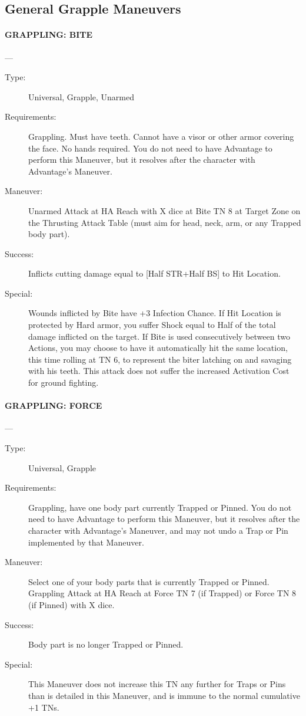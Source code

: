 \documentclass[oneside,11pt,english]{book}
\begin{document}
\subsection{General Grapple Maneuvers}
\paragraph{\large\label{man:GRAPPLING: BITE} GRAPPLING: BITE}---\quad{\large[X+1]}
\vspace{-10pt}\begin{description} 
\item [Type:] Universal, Grapple, Unarmed 
\item [Requirements:] Grappling. Must have teeth. Cannot have a visor or other armor covering the face. No 
hands required. You do not need to have Advantage to perform this Maneuver, but it resolves after the 
character with Advantage's Maneuver. 
\item [Maneuver:] Unarmed Attack at HA Reach with X dice at Bite TN 8 at Target Zone on the Thrusting 
Attack Table (must aim for head, neck, arm, or any Trapped body part). 
\item [Success:] Inflicts cutting damage equal to [Half STR+Half BS] to Hit Location. 
\item [Special:] Wounds inflicted by Bite have +3 Infection Chance. If Hit Location is protected by Hard armor, 
you suffer Shock equal to Half of the total damage inflicted on the target. 
If Bite is used consecutively between two Actions, you may choose to have it automatically hit the same 
location, this time rolling at TN 6, to represent the biter latching on and savaging with his teeth. 
This attack does not suffer the increased Activation Cost for ground fighting. 
\end{description}

\paragraph{\large\label{man:GRAPPLING: FORCE} GRAPPLING: FORCE}---\quad{\large[X+1]}
\vspace{-10pt}\begin{description} 
\item [Type:] Universal, Grapple 
\item [Requirements:] Grappling, have one body part currently Trapped or Pinned. You do not need to have 
Advantage to perform this Maneuver, but it resolves after the character with Advantage's Maneuver, and 
may not undo a Trap or Pin implemented by that Maneuver. 
\item [Maneuver:] Select one of your body parts that is currently Trapped or Pinned. Grappling Attack at HA 
Reach at Force TN 7 (if Trapped) or Force TN 8 (if Pinned) with X dice. 
\item [Success:] Body part is no longer Trapped or Pinned. 
\item [Special:] This Maneuver does not increase this TN any further for Traps or Pins than is detailed in this 
Maneuver, and is immune to the normal cumulative +1 TNs. 
\end{description}
\end{document}
